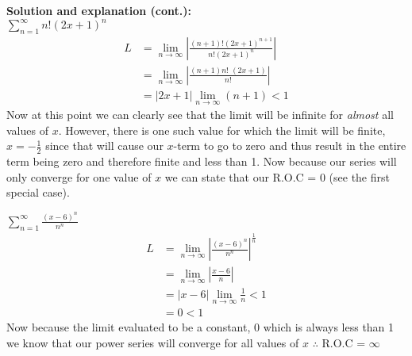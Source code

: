 \documentclass[addpoints]{exam}
\begin{document}
\begin{questions}
    \newpage

    \large \textbf{Solution and explanation (cont.):} \\ 
    
    \question \(\displaystyle
   \sum\limits_{n = 1}^\infty n\textbf{!}\left(2x+1\right)^{n}
    \)
    \begin{align*}
    L & = \mathop {\lim }\limits_{n \to \infty } \left| {\frac{{\left( {n + 1} \right)!{{\left( {2x + 1} \right)}^{n + 1}}}}{{n!{{\left( {2x + 1} \right)}^n}}}} \right|\\ &  = \mathop {\lim }\limits_{n \to \infty } \left| {\frac{{\left( {n + 1} \right)n!\,\,\left( {2x + 1} \right)}}{{n!}}} \right|\\ &  = \left| {2x + 1} \right|\mathop {\lim }\limits_{n \to \infty } \left( {n + 1} \right) < 1
    \end{align*}
    Now at this point we can clearly see that the limit will be infinite for \textit{almost} all values of $x$. However, there is one such value for which the limit will be finite, $x=-\frac{1}{2}$ since that will cause our $x$-term to go to zero and thus result in the entire term being zero and therefore finite and less than 1. Now because our series will only converge for one value of $x$ we can state that our R.O.C = 0 (see the first special case).
 
    \question \(\displaystyle
   \sum\limits_{n = 1}^\infty  {\frac{{{{\left( {x - 6} \right)}^n}}}{{{n^n}}}}
    \)
    \begin{align*}
        L & = \mathop {\lim }\limits_{n \to \infty } {\left| {\frac{{{{\left( {x - 6} \right)}^n}}}{{{n^n}}}} \right|^{\frac{1}{n}}}\\ &  = \mathop {\lim }\limits_{n \to \infty } \left| {\frac{{x - 6}}{n}} \right|\\ &  = \left| {x - 6} \right|\mathop {\lim }\limits_{n \to \infty } \frac{1}{n} < 1\\ &  = 0 < 1
    \end{align*}
    Now because the limit evaluated to be a constant, 0 which is always less than 1 we know that our power series will converge for all values of $x$ $\therefore$ R.O.C = $\infty$
 
\end{questions}

\newpage \normalsize
\end{document}

